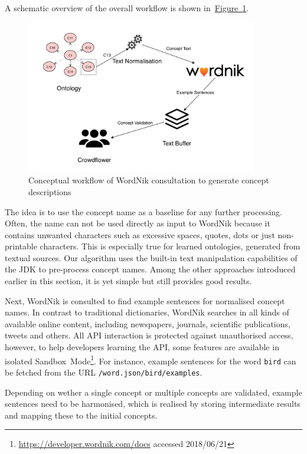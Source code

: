 \documentclass[draft,final]{vutinfth} %
\begin{document}
A schematic overview of the overall workflow is shown in~\hyperref[fig:external_source_workflow]{Figure~\ref*{fig:external_source_workflow}}.
\begin{figure}
	 \centering
	 \includegraphics[width=0.9\textwidth]{drawio/External_Source_Workflow}
	 \caption{Conceptual workflow of WordNik consultation to generate concept descriptions}\label{fig:external_source_workflow}
\end{figure}
The idea is to use the concept name as a baseline for any further processing. Often, the name can not be used directly as input to WordNik because it contains unwanted characters such as excessive spaces, quotes, dots or just non-printable characters. This is especially true for learned ontologies, generated from textual sources. Our algorithm uses the built-in text manipulation capabilities of the JDK to pre-process concept names. Among the other approaches introduced earlier in this section, it is yet simple but still provides good results. 

Next, WordNik is consulted to find example sentences for normalised concept names. In contrast to traditional dictionaries, WordNik searches in all kinds of available online content, including newspapers, journals, scientific publications, tweets and others. 
All API interaction is protected against unauthorised access, however, to help developers learning the API, some features are available in isolated Sandbox~Mode\footnote{\url{https://developer.wordnik.com/docs} accessed  2018/06/21}. For instance, example sentences for the word \texttt{bird} can be fetched from the URL \texttt{/word.json/bird/examples}.

Depending on wether a single concept or multiple concepts are validated, example sentences need to be harmonised, which is realised by storing intermediate results and mapping these to the initial concepts. 
\end{document}
